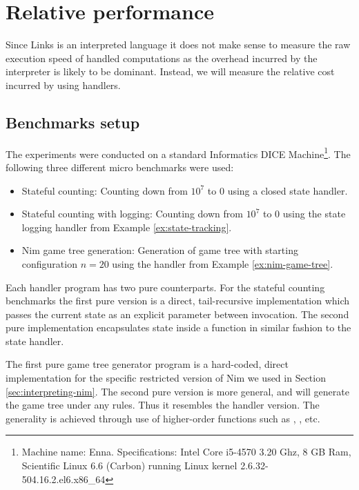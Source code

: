 \section{Relative performance}\label{sec:eval-performance}
Since Links is an interpreted language it does not make sense to measure the raw execution speed of handled computations as the overhead incurred by the interpreter is likely to be dominant. Instead, we will measure the relative cost incurred by using handlers.

\subsection{Benchmarks setup}
The experiments were conducted on a standard Informatics DICE Machine\footnote{Machine name: Enna. Specifications: Intel Core i5-4570 3.20 Ghz, 8 GB Ram, Scientific Linux 6.6 (Carbon) running Linux kernel 2.6.32-504.16.2.el6.x86\_64}. The following three different micro benchmarks were used:
\begin{itemize}
  \item Stateful counting: Counting down from $10^7$ to $0$ using a closed state handler.
  \item Stateful counting with logging: Counting down from $10^7$ to $0$ using the state logging handler from Example \ref{ex:state-tracking}.
  \item Nim game tree generation: Generation of game tree with starting configuration $n = 20$ using the handler from Example \ref{ex:nim-game-tree}.
\end{itemize}
Each handler program has two pure counterparts. For the stateful counting benchmarks the first pure version is a direct, tail-recursive implementation which passes the current state as an explicit parameter between invocation. The second pure implementation encapsulates state inside a function in similar fashion to the state handler. 

The first pure game tree generator program is a hard-coded, direct implementation for the specific restricted version of Nim we used in Section \ref{sec:interpreting-nim}. The second pure version is more general, and will generate the game tree under any rules. Thus it resembles the handler version. The generality is achieved through use of higher-order functions such as , , etc.


